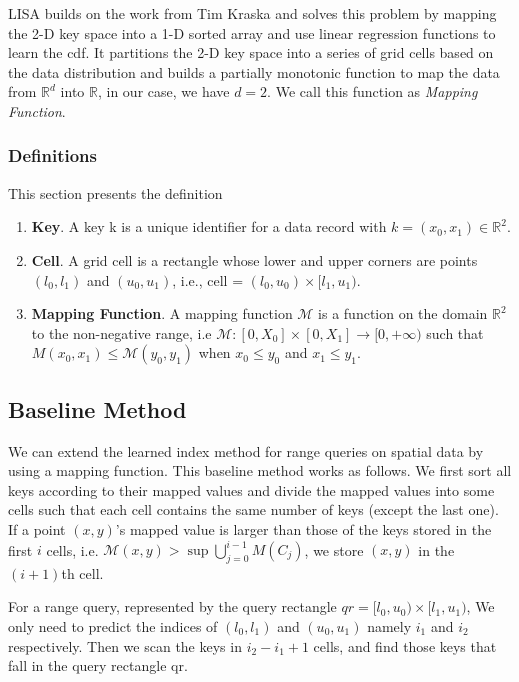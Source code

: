 LISA builds on the work from Tim Kraska \cite{kraska2018case} and solves this problem by mapping the 2-D key space into a 1-D sorted array and use linear regression functions to learn the cdf. It partitions the 2-D key space into a series of grid cells based on the data distribution and builds a partially monotonic function to map the data from $\mathbb{R}^d$ into $\mathbb{R}$, in our case, we have $d=2$. We call this function as \textit{Mapping Function}.

\subsubsection{Definitions}

This section presents the definition

\begin{enumerate}
	\item \textbf{Key}. A key k is a unique identifier for a data record with $k = (x_{0}, x_{1}) \in \mathbb{R}^{2}$. 
    
	\item \textbf{Cell}. A grid cell is a rectangle whose lower and upper corners are points $(l_0, l_1)$ and  $(u_0,u_1)$, i.e.,  cell = $(l_{0},u_{0}) \times [l_{1},u_{1})$.
	
	\item \textbf{Mapping Function}. A mapping function $\mathcal{M}$ is a function on the domain $\mathbb{R}^2$ to the non-negative range, i.e $\mathcal{M}:[0,X_{0}]\times [0,X_{1}]\to [0,+\infty)$ such that $M(x_0,x_{1}) \leq \mathcal{M}(y_{0},y_1)$ when $x_0 \leq y_0$ and $x_1 \leq y_1$.
\end{enumerate}

\subsection{Baseline Method}  

We can extend the learned index method for range queries on spatial data by using a mapping function. This baseline method works as follows. We first sort all keys according to their mapped values and divide the mapped values into some cells such that each cell contains the same number of keys (except the last one). If a point $(x,y)$’s mapped value is larger than those of the keys stored in the first $i$ cells, i.e. $\mathcal{M}(x,y) > \sup \bigcup\limits_{j=0}^{i-1} M(C_{j})$, we store $(x,y)$ in the $(i+1)$th cell. 

For a range query, represented by the query rectangle $qr = [l_{0},u_{0}) \times [l_{1},u_{1})$, We only need to predict the indices of $(l_{0}, l_{1})$ and $(u_{0},u_{1})$ namely $i_{1}$ and $i_{2}$ respectively. Then we scan the keys in $i_{2}-i_{1}+1$ cells, and find those keys that fall in the query rectangle qr. 

